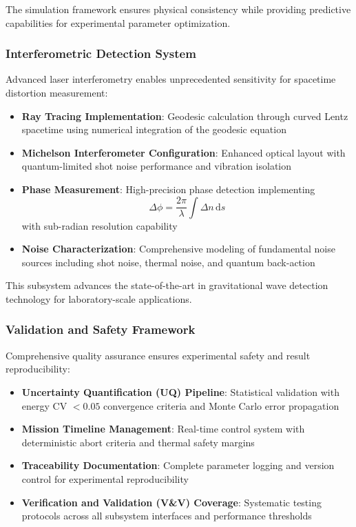 \documentclass[12pt,a4paper]{article}
\newcommand{\dd}[1]{\,\mathrm{d}#1}
\begin{document}
The simulation framework ensures physical consistency while providing predictive capabilities for experimental parameter optimization.

\subsubsection{Interferometric Detection System}

Advanced laser interferometry enables unprecedented sensitivity for spacetime distortion measurement:

\begin{itemize}
\item \textbf{Ray Tracing Implementation}: Geodesic calculation through curved Lentz spacetime using numerical integration of the geodesic equation
\item \textbf{Michelson Interferometer Configuration}: Enhanced optical layout with quantum-limited shot noise performance and vibration isolation
\item \textbf{Phase Measurement}: High-precision phase detection implementing 
\begin{equation}
\Delta\phi = \frac{2\pi}{\lambda} \int \Delta n \dd{s}
\end{equation}
with sub-radian resolution capability
\item \textbf{Noise Characterization}: Comprehensive modeling of fundamental noise sources including shot noise, thermal noise, and quantum back-action
\end{itemize}

This subsystem advances the state-of-the-art in gravitational wave detection technology for laboratory-scale applications.

\subsubsection{Validation and Safety Framework}

Comprehensive quality assurance ensures experimental safety and result reproducibility:

\begin{itemize}
\item \textbf{Uncertainty Quantification (UQ) Pipeline}: Statistical validation with energy CV $< 0.05$ convergence criteria and Monte Carlo error propagation
\item \textbf{Mission Timeline Management}: Real-time control system with deterministic abort criteria and thermal safety margins
\item \textbf{Traceability Documentation}: Complete parameter logging and version control for experimental reproducibility
\item \textbf{Verification and Validation (V\&V) Coverage}: Systematic testing protocols across all subsystem interfaces and performance thresholds
\end{itemize}
\end{document}
